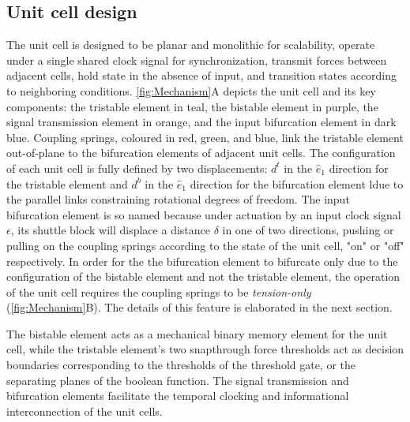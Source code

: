 \subsection*{Unit cell design}
The unit cell is designed to be planar and monolithic for scalability, operate under a single shared clock signal for synchronization, transmit forces between adjacent cells, hold state in the absence of input, and transition states according to neighboring conditions. \autoref*{fig:Mechanism}A depicts the unit cell and its key components: the tristable element in teal, the bistable element in purple, the signal transmission element in orange, and the input bifurcation element in dark blue. Coupling springs, coloured in red, green, and blue, link the tristable element out-of-plane to the bifurcation elements of adjacent unit cells. The configuration of each unit cell is fully defined by two displacements: \(d^t\) in the \(\hat{e}_1\) direction for the tristable element and \(d^b\) in the \(\hat{e}_1\) direction for the bifurcation element ldue to the parallel links constraining rotational degrees of freedom. The input bifurcation element is so named because under actuation by an input clock signal \(\epsilon\), its shuttle block will displace a distance \(\delta\) in one of two directions, pushing or pulling on the coupling springs according to the state of the unit cell, "on" or "off" respectively. In order for the the bifurcation element to bifurcate only due to the configuration of the bistable element and not the tristable element, the operation of the unit cell requires the coupling springs to be \emph{tension-only} (\autoref*{fig:Mechanism}B). The details of this feature is elaborated in the next section. 

The bistable element acts as a mechanical binary memory element for the unit cell, while the tristable element's two snapthrough force thresholds act as decision boundaries corresponding to the thresholds of the threshold gate, or the separating planes of the boolean function. The signal transmission and bifurcation elements facilitate the temporal clocking and informational interconnection of the unit cells. 

